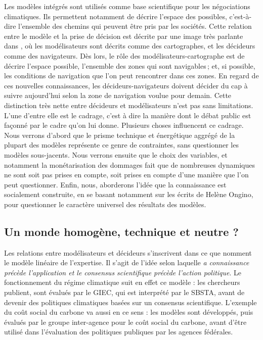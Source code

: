 Les modèles intégrés sont utilisés comme base scientifique pour les négociations climatiques. Ils permettent notamment de décrire l'espace des possibles, c'est-à-dire l'ensemble des chemins qui peuvent être pris par les sociétés. Cette relation entre le modèle et la prise de décision est décrite par une image très parlante dans \cite{edenhofer_mapmakers_2014}, où les modélisateurs sont décrits comme des cartographes, et les décideurs comme des navigateurs. Dès lors, le rôle des modélisateurs-cartographe est de décrire l'espace possible, l'ensemble des zones qui sont navigables ; et, si possible, les conditions de navigation que l'on peut rencontrer dans ces zones.  En regard de ces nouvelles connaissances, les décideurs-navigateurs doivent décider du cap à suivre aujourd'hui selon la zone de navigation voulue pour demain. Cette distinction très nette entre décideurs et modélisateurs n'est pas sans limitations. L'une d'entre elle est le cadrage, c'est à dire la manière dont le débat public est façonné par le cadre qu'on lui donne.  Plusieurs choses influencent ce cadrage. Nous verrons d'abord que le prisme technique et énergétique aggrégé de la plupart des modèles représente ce genre de contraintes, sans questionner les modèles sous-jacents. Nous verrons ensuite que le choix des variables, et notamment la monétarisation des dommages fait que de nombreuses dynamiques ne sont soit pas prises en compte, soit prises en compte d'une manière que l'on peut questionner. Enfin, nous, aborderons l'idée que la connaissance est socialement construite, en se basant notamment sur les écrits de Helène Ongino, pour questionner le caractère universel des résultats des modèles. 

\subsection{Un monde homogène, technique et neutre ?}

Les relations entre modélisateurs et décideurs s'inscrivent dans ce que \cite{aykut_gouverner_nodate} nomment le modèle linéaire de l'expertise. Il s'agit de l'idée selon laquelle \emph{a connaissance précède l’application et le consensus scientifique précède l’action politique}. Le fonctionnement du régime climatique suit en effet ce modèle : les chercheurs publient, sont évalués par le GIEC, qui est interprété par le SBSTA, avant de devenir des politiques climatiques basées sur un consensus scientifique. L'exemple du coût social du carbone va aussi en ce sens : les modèles sont développés, puis évalués par le groupe inter-agence pour le coût social du carbone, avant d'être utilisé dans l'évaluation des politiques publiques par les agences fédérales. 

